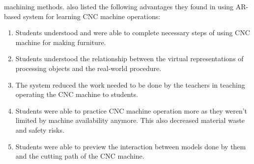 machining methods.\cite{LinAndLee2020} \textcite{LinAndLee2020} also listed 
the following advantages they found in using AR-based system for learning CNC 
machine operations:
\begin{enumerate}
	\item Students understood and were able to complete necessary steps of using CNC machine for making furniture.
	\item Students understood the relationship between the virtual representations of processing objects and the real-world procedure.
	\item The system reduced the work needed to be done by the teachers in teaching operating the CNC machine to students.
	\item Students were able to practice CNC machine operation more as they weren't limited by machine availability anymore. This also decreased material waste and safety risks.
	\item Students were able to preview the interaction between models done by them and the cutting path of the CNC machine.
\end{enumerate}
